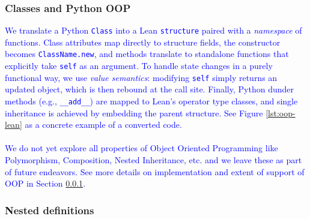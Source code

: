 \documentclass{article}
\newcommand{\code}{\lstinline}
\newcommand{\suggest}[1]{\textcolor{blue}{#1}}
\begin{document}
{%


\subsubsection{Classes and Python OOP} \label{sec:oop}

\suggest{ We translate a Python \code{Class} into a Lean \code{structure} paired with a \emph{namespace} of functions. Class attributes map directly to structure fields, the constructor becomes \code{ClassName.new}, and methods translate to standalone functions that explicitly take \code{self} as an argument. To handle state changes in a purely functional way, we use \emph{value semantics}: modifying \code{self} simply returns an updated object, which is then rebound at the call site. Finally, Python dunder methods (e.g., \code{__add__}) are mapped to Lean's operator type classes, and single inheritance is achieved by embedding the parent structure. See Figure \ref{lst:oop-lean} as a concrete example of a converted code. \\\\ We do not yet explore all properties of Object Oriented Programming like Polymorphism, Composition, Nested Inheritance, etc. and we leave these as part of future endeavors. See more details on implementation and extent of support of OOP in Section \ref{sec:oop}.
}

\subsubsection{Nested definitions}

}
\end{document}

